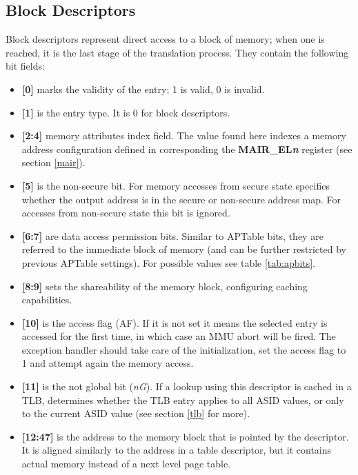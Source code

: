 \documentclass[12pt,a4paper,openright,twoside]{report}
\begin{document}
\subsection{Block Descriptors}
\label{mmublock}
Block descriptors represent direct access to a block of memory; when one is reached,
it is the last stage of the translation process. They contain the following bit
fields:
\begin{itemize}
    \item \textbf{[0]} marks the validity of the entry; 1 is valid, 0 is invalid.
    \item \textbf{[1]} is the entry type. It is 0 for block descriptors.
    \item \textbf{[2:4]} memory attributes index field. The value found here
        indexes a memory address configuration defined in corresponding 
        the \textbf{MAIR\_EL\textit{n}} register (see section \ref{mair}).
    \item \textbf{[5]} is the non-secure bit. For memory accesses from 
        secure state specifies whether the output address is in
        the secure or non-secure address map. For accesses from non-secure state
        this bit is ignored.
    \item \textbf{[6:7]} are data access permission bits. Similar to APTable bits,
        they are referred to the immediate block of memory (and can be further
        restricted by previous APTable settings). For possible values see table
        \ref{tab:apbits}.
    \item \textbf{[8:9]} sets the shareability of the memory block, configuring
        caching capabilities.
    \item \textbf{[10]} is the access flag (AF). If it is not set it means the 
        selected entry is accessed for the first time, in which case an MMU abort
        will be fired. The exception handler should take care of the initialization,
        set the access flag to 1 and attempt again the memory access.
    \item \textbf{[11]} is the not global bit (\textit{nG}). If a lookup using this 
        descriptor is cached in a TLB, determines whether the TLB
        entry applies to all ASID values, or only to the current ASID value
        (see section \ref{tlb} for more).
    \item \textbf{[12:47]} is the address to the memory block that is pointed by
        the descriptor. It is aligned similarly to the address in a table descriptor,
        but it contains actual memory instead of a next level page table.

\end{itemize}
\end{document}
